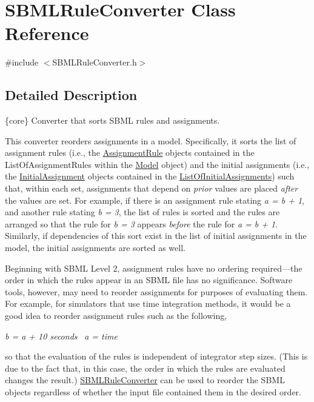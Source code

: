 \hypertarget{class_s_b_m_l_rule_converter}{}\section{S\+B\+M\+L\+Rule\+Converter Class Reference}
\label{class_s_b_m_l_rule_converter}


{\ttfamily \#include $<$S\+B\+M\+L\+Rule\+Converter.\+h$>$}



\subsection{Detailed Description}
\{core\} Converter that sorts S\+B\+ML rules and assignments.



This converter reorders assignments in a model. Specifically, it sorts the list of assignment rules (i.\+e., the \hyperlink{class_assignment_rule}{Assignment\+Rule} objects contained in the List\+Of\+Assignment\+Rules within the \hyperlink{class_model}{Model} object) and the initial assignments (i.\+e., the \hyperlink{class_initial_assignment}{Initial\+Assignment} objects contained in the \hyperlink{class_list_of_initial_assignments}{List\+Of\+Initial\+Assignments}) such that, within each set, assignments that depend on {\itshape prior} values are placed {\itshape after} the values are set. For example, if there is an assignment rule stating {\itshape a = b + 1}, and another rule stating {\itshape b = 3}, the list of rules is sorted and the rules are arranged so that the rule for {\itshape b = 3} appears {\itshape before} the rule for {\itshape a = b + 1}. Similarly, if dependencies of this sort exist in the list of initial assignments in the model, the initial assignments are sorted as well.

Beginning with S\+B\+ML Level 2, assignment rules have no ordering required---the order in which the rules appear in an S\+B\+ML file has no significance. Software tools, however, may need to reorder assignments for purposes of evaluating them. For example, for simulators that use time integration methods, it would be a good idea to reorder assignment rules such as the following,

{\itshape b = a + 10 seconds}~\newline
 {\itshape a = time}

so that the evaluation of the rules is independent of integrator step sizes. (This is due to the fact that, in this case, the order in which the rules are evaluated changes the result.) \hyperlink{class_s_b_m_l_rule_converter}{S\+B\+M\+L\+Rule\+Converter} can be used to reorder the S\+B\+ML objects regardless of whether the input file contained them in the desired order.

